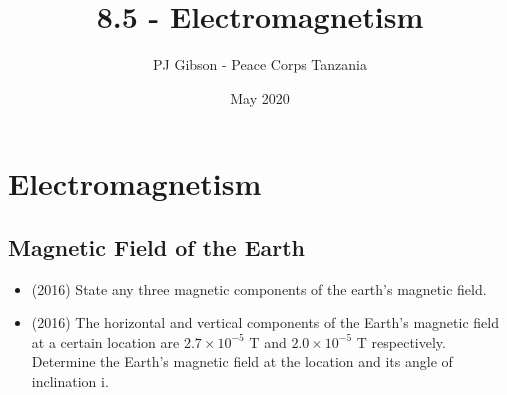 \documentclass{article}
\title{8.5 - Electromagnetism}
\author{PJ Gibson - Peace Corps Tanzania}
\date{May 2020}
\begin{document}
\maketitle


\section{Electromagnetism}

\subsection{Magnetic Field of the Earth}
\begin{itemize}
\item (2016)  State any three magnetic components of the earth’s magnetic field.
\item (2016)  The horizontal and vertical components of the Earth’s magnetic field at a certain location are $ 2.7 \times 10^{-5}$ T and $ 2.0 \times 10^{-5}$ T respectively.  Determine the Earth’s magnetic field at the location and its angle of inclination i.
\end{itemize}
\end{document}
